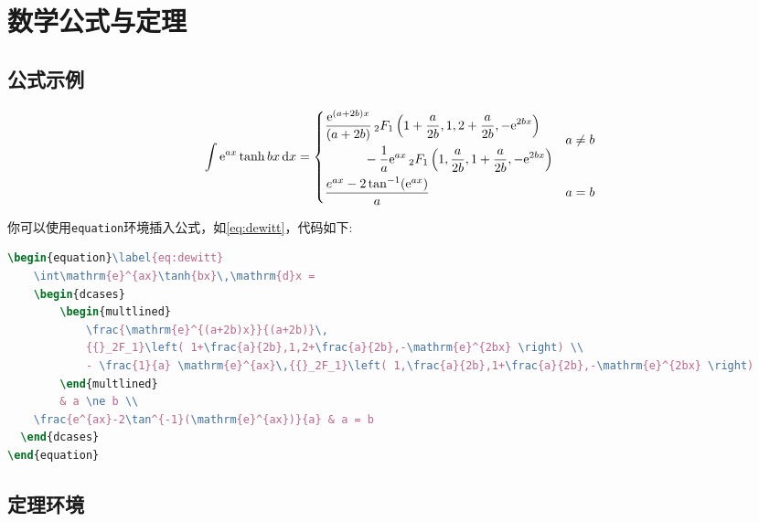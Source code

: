 \chapter{数学公式与定理}

\section{公式示例}
\begin{equation}\label{eq:dewitt}
    \int \mathrm{e}^{ax} \tanh {bx} \, \mathrm{d}x =
    \begin{dcases}
        \begin{multlined}
            \frac{\mathrm{e}^{(a+2b)x}}{(a + 2b)} \,
            {{}_2F_1} \left( 1 + \frac{a}{2b}, 1, 2+\frac{a}{2b}, -\mathrm{e}^{2bx} \right) \\
            - \frac{1}{a} \mathrm{e}^{ax} \, {{}_2F_1} \left( 1, \frac{a}{2b}, 1 + \frac{a}{2b}, -\mathrm{e}^{2bx} \right)
        \end{multlined}
        & a \ne b \\
    \frac{e^{ax} - 2 \tan^{-1}(\mathrm{e}^{ax})}{a} & a = b
  \end{dcases}
\end{equation}

你可以使用\lstinline|equation|环境插入公式，如\cref{eq:dewitt}，代码如下:
\begin{lstlisting}[language=TeX]
\begin{equation}\label{eq:dewitt}
    \int\mathrm{e}^{ax}\tanh{bx}\,\mathrm{d}x =
    \begin{dcases}
        \begin{multlined}
            \frac{\mathrm{e}^{(a+2b)x}}{(a+2b)}\,
            {{}_2F_1}\left( 1+\frac{a}{2b},1,2+\frac{a}{2b},-\mathrm{e}^{2bx} \right) \\
            - \frac{1}{a} \mathrm{e}^{ax}\,{{}_2F_1}\left( 1,\frac{a}{2b},1+\frac{a}{2b},-\mathrm{e}^{2bx} \right)
        \end{multlined}
        & a \ne b \\
    \frac{e^{ax}-2\tan^{-1}(\mathrm{e}^{ax})}{a} & a = b
  \end{dcases}
\end{equation}
\end{lstlisting}

\section{定理环境}

